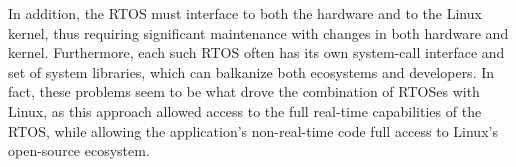 In addition, the RTOS must interface to both the hardware and to
the Linux kernel, thus requiring significant maintenance with
changes in both hardware and kernel.
Furthermore, each such RTOS often has its own system-call interface
and set of system libraries, which can balkanize both ecosystems and
developers.
In fact, these problems seem to be what drove the combination of
RTOSes with Linux, as this approach allowed access to the full real-time
capabilities of the RTOS, while allowing the application's non-real-time
code full access to Linux's open-source ecosystem.

\begin{figure}
\centering
{}
\end{figure}
